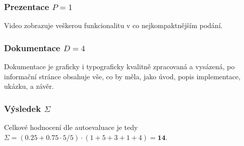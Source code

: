 \documentclass[11pt,a4paper]{article}
\begin{document}
                \subsubsection*{Prezentace $P = 1$}

                Video zobrazuje veškerou funkcionalitu v co nejkompaktnějším podání.

                \subsubsection*{Dokumentace $D = 4$}

                Dokumentace je graficky i typograficky kvalitně zpracovaná a vysázená, po informační stránce obsahuje vše,
                co by měla, jako úvod, popis implementace, ukázku, a závěr.

                \subsubsection*{Výsledek $\Sigma$}

                Celkové hodnocení dle autoevaluace je tedy $\Sigma = (0.25 + 0.75 \cdot 5/5) \cdot (1 + 5 + 3 + 1 + 4) = \mathbf{14}$.

	\clearpage

 	\renewcommand{\refname}{Zdroje}

	
 	
 
\end{document}
